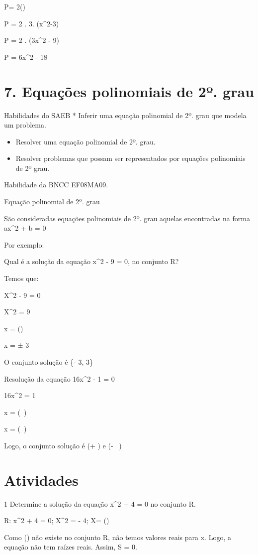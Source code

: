 {P= 2()

P = 2 . 3. (x^2-3)

P = 2 . (3x^2 - 9)

P = 6x^2 - 18


\section{7. Equações polinomiais de 2º.
grau}

Habilidades do SAEB * Inferir uma equação polinomial de 2º. grau que
modela um problema.

\begin{itemize}
\item
  Resolver uma equação polinomial de 2º. grau.
\item
  Resolver problemas que possam ser representados por equações
  polinomiais de 2º grau.
\end{itemize}

Habilidade da BNCC EF08MA09.

Equação polinomial de 2º. grau

São consideradas equações polinomiais de 2º. grau aquelas encontradas na
forma ax^2 + b = 0

Por exemplo:

Qual é a solução da equação x^2 - 9 = 0, no conjunto R?

Temos que:

X^2 - 9 = 0

X^2 = 9

x = ()

x = ± 3

O conjunto solução é \{- 3, 3\}

Resolução da equação 16x^2 - 1 = 0

16x^2 = 1

x = (\  \pm {})

x = (\  \pm {})

Logo, o conjunto solução é (+ ) e (- \ )

\section{Atividades}

\num{1} Determine a solução da equação x^2 + 4 = 0 no conjunto R.

R: x^2 + 4 = 0; X^2 = - 4; X= ()

Como () não existe no conjunto R, não temos valores reais
para x. Logo, a equação não tem raízes reais. Assim, S = 0.

}
